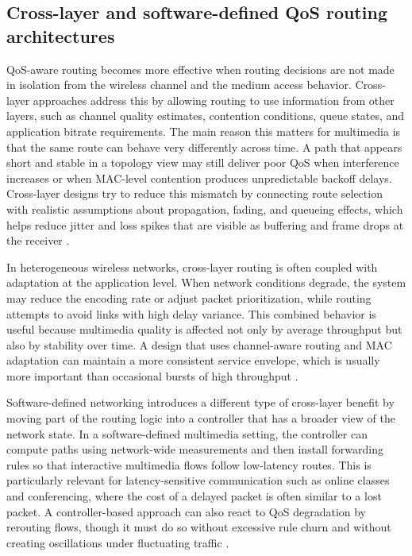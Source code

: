 \documentclass[12pt]{article}
\begin{document}
\subsection{Cross-layer and software-defined QoS routing architectures}
QoS-aware routing becomes more effective when routing decisions are not made in isolation from the wireless channel and the medium access behavior. Cross-layer approaches address this by allowing routing to use information from other layers, such as channel quality estimates, contention conditions, queue states, and application bitrate requirements. The main reason this matters for multimedia is that the same route can behave very differently across time. A path that appears short and stable in a topology view may still deliver poor QoS when interference increases or when MAC-level contention produces unpredictable backoff delays. Cross-layer designs try to reduce this mismatch by connecting route selection with realistic assumptions about propagation, fading, and queueing effects, which helps reduce jitter and loss spikes that are visible as buffering and frame drops at the receiver \cite{Goyal2025321}.

In heterogeneous wireless networks, cross-layer routing is often coupled with adaptation at the application level. When network conditions degrade, the system may reduce the encoding rate or adjust packet prioritization, while routing attempts to avoid links with high delay variance. This combined behavior is useful because multimedia quality is affected not only by average throughput but also by stability over time. A design that uses channel-aware routing and MAC adaptation can maintain a more consistent service envelope, which is usually more important than occasional bursts of high throughput \cite{Goyal2025321,Goyal2023}.

Software-defined networking introduces a different type of cross-layer benefit by moving part of the routing logic into a controller that has a broader view of the network state. In a software-defined multimedia setting, the controller can compute paths using network-wide measurements and then install forwarding rules so that interactive multimedia flows follow low-latency routes. This is particularly relevant for latency-sensitive communication such as online classes and conferencing, where the cost of a delayed packet is often similar to a lost packet. A controller-based approach can also react to QoS degradation by rerouting flows, though it must do so without excessive rule churn and without creating oscillations under fluctuating traffic \cite{Suguna2022}.
\end{document}
